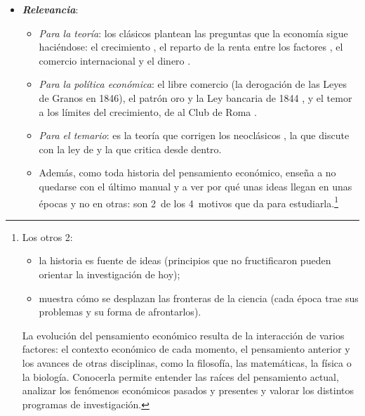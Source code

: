 \documentclass[11pt]{article}
\begin{document}
\begin{itemize}
\item \textbf{\emph{Relevancia}}:
  \begin{itemize}
  \item \emph{Para la teoría}: los clásicos plantean las preguntas que la economía sigue haciéndose: el crecimiento  , el reparto de la renta entre los factores , el comercio internacional  y el dinero .
  \item \emph{Para la política económica}: el libre comercio (la derogación de las Leyes de Granos en 1846), el patrón oro y la Ley bancaria de 1844 , y el temor a los límites del crecimiento, de  al Club de Roma .
  \item \emph{Para el temario}: es la teoría que corrigen los neoclásicos , la que  discute con la ley de   y la que  critica desde dentro.
  \item Además, como toda historia del pensamiento económico, enseña a no quedarse con el último manual y a ver por qué unas ideas llegan en unas épocas y no en otras: son 2~de los 4~motivos que da  para estudiarla\nocite{Schumpeter1954History}.\footnote{Los otros 2:
\begin{itemize}
\item la historia es fuente de ideas (principios que no fructificaron pueden orientar la investigación de hoy);
\item muestra cómo se desplazan las fronteras de la ciencia (cada época trae sus problemas y su forma de afrontarlos).
\end{itemize}
La evolución del pensamiento económico resulta de la interacción de varios factores: el contexto económico de cada momento, el pensamiento anterior y los avances de otras disciplinas, como la filosofía, las matemáticas, la física o la biología. Conocerla permite entender las raíces del pensamiento actual, analizar los fenómenos económicos pasados y presentes y valorar los distintos programas de investigación.}
  \end{itemize}


\end{itemize}
\end{document}
